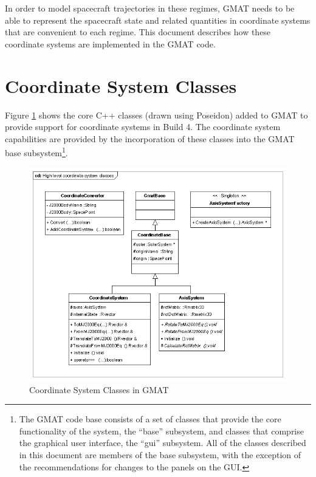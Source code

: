 In order to model spacecraft trajectories in these regimes, GMAT needs to be able to represent the
spacecraft state and related quantities in coordinate systems that are convenient to each regime.
This document describes how these coordinate systems are implemented in the GMAT code.


\section{\label{sec:CSClassDescription}Coordinate System Classes}

Figure \ref{figure:HighLevelCSClasses} shows the core C++ classes (drawn using
Poseidon\cite{poseidon}) added to GMAT to provide support for coordinate systems in Build 4. The
coordinate system capabilities are provided by the incorporation of these classes into the GMAT base
subsystem\footnote{The GMAT code base consists of a set of classes that provide the core
functionality of the system, the {}``base'' subsystem, and classes that comprise the graphical user
interface, the {}``gui'' subsystem.  All of the classes described in this document are members of
the base subsystem, with the exception of the recommendations for changes to the panels on the
GUI.}.

\begin{figure}[htb]
\begin{center}
\includegraphics[328,272]{Images/Highlevelcoordinatesystemclasses.png}
\caption{\label{figure:HighLevelCSClasses}Coordinate System Classes in GMAT}
\end{center}
\end{figure}

